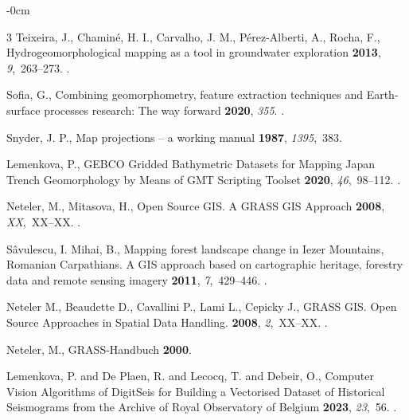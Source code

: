 \documentclass[technologies,article,submit,pdftex,moreauthors]{Definitions/mdpi}
\begin{document}
\begin{adjustwidth}{-\extralength}{0cm}
\begin{thebibliography}{3}
Teixeira, J., Chaminé, H. I., Carvalho, J. M., Pérez-Alberti, A., Rocha, F.,
\newblock Hydrogeomorphological mapping as a tool in groundwater exploration
 {\bf 2013}, {\em 9},~263--273. 
.

Sofia, G.,
\newblock Combining geomorphometry, feature extraction techniques and Earth-surface processes research: The way forward
 {\bf 2020}, {\em 355}. 
.

Snyder, J. P., 
\newblock Map projections -- a working manual
 {\bf 1987}, {\em 1395},~383. 

Lemenkova, P.,
\newblock GEBCO Gridded Bathymetric Datasets for Mapping Japan Trench Geomorphology by Means of GMT Scripting Toolset
 {\bf 2020}, {\em 46},~98--112. 
.

Neteler, M., Mitasova, H.,
\newblock Open Source GIS. A GRASS GIS Approach
 {\bf 2008}, {\em XX},~XX--XX. 
.

Sâvulescu, I. Mihai, B., 
\newblock Mapping forest landscape change in Iezer Mountains, Romanian Carpathians. A GIS approach based on cartographic heritage, forestry data and remote sensing imagery
 {\bf 2011}, {\em 7},~429--446. 
.

Neteler M., Beaudette D., Cavallini P., Lami L., Cepicky J., 
\newblock GRASS GIS. Open Source Approaches in Spatial Data Handling.
 {\bf 2008}, {\em 2},~XX--XX. 
.

 Neteler, M.,
\newblock GRASS-Handbuch
 {\bf 2000}.

Lemenkova, P. and De Plaen, R. and Lecocq, T. and Debeir, O.,
\newblock Computer Vision Algorithms of DigitSeis for Building a Vectorised Dataset of Historical Seismograms from the Archive of Royal Observatory of Belgium
 {\bf 2023}, {\em 23},~56. 
.


\end{thebibliography}
\end{adjustwidth}
\end{document}
